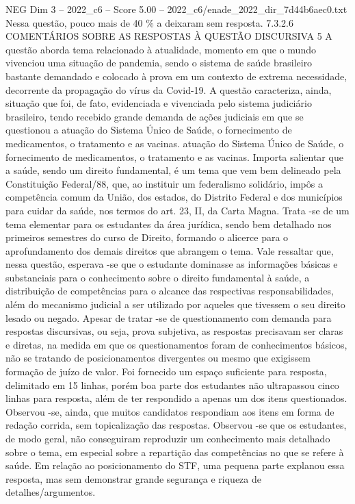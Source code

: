 \begin{textsample}{NEG Dim 3 – 2022\_c6 – Score 5.00 – 2022\_c6/enade\_2022\_dir\_7d44b6aec0.txt}
Nessa questão, pouco mais de 40 \% a deixaram sem resposta. 7.3.2.6 COMENTÁRIOS SOBRE AS RESPOSTAS À QUESTÃO DISCURSIVA 5 A questão aborda tema relacionado à atualidade, momento em que o mundo vivenciou uma situação de pandemia, sendo o sistema de saúde brasileiro bastante demandado e colocado à prova em um contexto de extrema necessidade, decorrente da propagação do vírus da Covid-19.
A questão caracteriza, ainda, situação que foi, de fato, evidenciada e vivenciada pelo sistema judiciário brasileiro, tendo recebido grande demanda de ações judiciais em que se questionou a atuação do Sistema Único de Saúde, o fornecimento de medicamentos, o tratamento e as vacinas. atuação do Sistema Único de Saúde, o fornecimento de medicamentos, o tratamento e as vacinas.
Importa salientar que a saúde, sendo um direito fundamental, é um tema que vem bem delineado pela Constituição Federal/88, que, ao instituir um federalismo solidário, impôs a competência comum da União, dos estados, do Distrito Federal e dos municípios para cuidar da saúde, nos termos do art. 23, II, da Carta Magna.
Trata -se de um tema elementar para os estudantes da área jurídica, sendo bem detalhado nos primeiros semestres do curso de Direito, formando o alicerce para o aprofundamento dos demais direitos que abrangem o tema.
Vale ressaltar que, nessa questão, esperava -se que o estudante dominasse as informações básicas e substanciais para o conhecimento sobre o direito fundamental à saúde, a distribuição de competências para o alcance das respectivas responsabilidades, além do mecanismo judicial a ser utilizado por aqueles que tivessem o seu direito lesado ou negado.
Apesar de tratar -se de questionamento com demanda para respostas discursivas, ou seja, prova subjetiva, as respostas precisavam ser claras e diretas, na medida em que os questionamentos foram de conhecimentos básicos, não se tratando de posicionamentos divergentes ou mesmo que exigissem formação de juízo de valor.
Foi fornecido um espaço suficiente para resposta, delimitado em 15 linhas, porém boa parte dos estudantes não ultrapassou cinco linhas para resposta, além de ter respondido a apenas um dos itens questionados.
Observou -se, ainda, que muitos candidatos respondiam aos itens em forma de redação corrida, sem topicalização das respostas.
Observou -se que os estudantes, de modo geral, não conseguiram reproduzir um conhecimento mais detalhado sobre o tema, em especial sobre a repartição das competências no que se refere à saúde.
Em relação ao posicionamento do STF, uma pequena parte explanou essa resposta, mas sem demonstrar grande segurança e riqueza de detalhes/argumentos.

\end{textsample}

